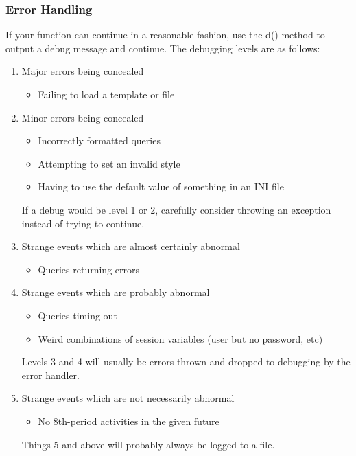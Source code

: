 \documentclass[11pt,letterpaper]{report}
\begin{document}
\subsubsection{Error Handling}
If your function can continue in a reasonable fashion, use the d() method to output a debug message and continue.
The debugging levels are as follows:
\begin{enumerate}
\item Major errors being concealed
	\begin{itemize}
		\item Failing to load a template or file
	\end{itemize}
\item Minor errors being concealed
	\begin{itemize}
		\item Incorrectly formatted queries
		\item Attempting to set an invalid style
		\item Having to use the default value of something in an INI file
	\end{itemize}

If a debug would be level 1 or 2, carefully consider throwing an exception instead of trying to continue.
	
\item Strange events which are almost certainly abnormal
	\begin{itemize}
		\item Queries returning errors
	\end{itemize}
\item Strange events which are probably abnormal
	\begin{itemize}
		\item Queries timing out
		\item Weird combinations of session variables (user but no password, etc)
	\end{itemize}

Levels 3 and 4 will usually be errors thrown and dropped to debugging by the error handler.

\item Strange events which are not necessarily abnormal
	\begin{itemize}
		\item No 8th-period activities in the given future
	\end{itemize}

Things 5 and above will probably always be logged to a file.
	

\end{enumerate}
\end{document}
